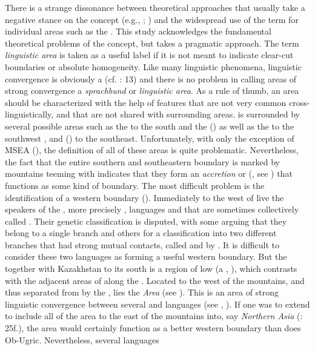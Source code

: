 \noindent There is a strange dissonance between theoretical approaches that usually take a negative stance on the concept (e.g., \citealt{Dahl2001}; \citealt{Bisang2010}) and the widespread use of the term for individual areas such as the . This study acknowledges the fundamental theoretical problems of the concept, but takes a pragmatic approach. The term \textit{linguistic area} is taken as a useful label if it is not meant to indicate clear-cut boundaries or absolute homogeneity. Like many linguistic phenomena, linguistic convergence is obviously a  (cf. \citealt{Langacker2008}: 13) and there is no problem in calling areas of strong convergence a \textit{sprachbund} or \textit{linguistic area}. As a rule of thumb, an area should be characterized with the help of features that are not very common cross-linguistically, and that are not shared with surrounding areas.  is surrounded by several possible areas such as the \textit{} to the south \citep{Kraaijenbrink2009} and the \textit{} (\citealt[82]{Novák2014}) as well as the \textit{} to the southwest \citep{Stilo2015}, and \textit{} (\citealt{EnfieldComrie2015}) to the southeast. Unfortunately, with only the exception of MSEA (\citealt{EnfieldComrie2015}), the definition of all of these areas is quite problematic. Nevertheless, the fact that the entire southern and southeastern boundary is marked by mountains teeming with  indicates that they form an \textit{accretion} or \textit{} (\citealt{Nichols1992,Nichols1997,Nichols2015}, see ) that functions as some kind of boundary. The most difficult problem is the identification of a western boundary (\citealt[873]{HeggartyRenfrew2014b}). Immediately to the west of  live the speakers of the , more precisely , languages  and  that are sometimes collectively called . Their genetic classification is disputed, with some arguing that they belong to a single branch and others for a classification into two different branches that had strong mutual contacts, called  and  by \citet[65]{Janhunen2009}. It is difficult to consider these two languages as forming a useful western boundary. But the  together with Kazakhstan to its south is a region of low  (a , \citealt{Nichols1992}), which contrasts with the adjacent areas of  along the . Located to the west of the  mountains, and thus separated from  by the , lies the \textit{ Area} (see \citealt{Manzelli2015}). This is an area of strong linguistic convergence between several  and  languages (see , ). If one was to extend  to include all of the area to the east of the  mountains into, say \textit{Northern Asia} (\citealt{Nichols1992}: 25f.), the  area would certainly function as a better western boundary than does Ob-Ugric. Nevertheless, several languages 